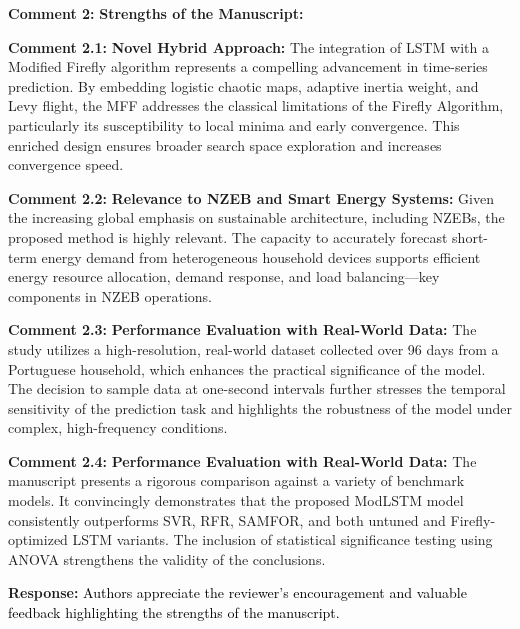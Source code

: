 \documentclass[12pt]{article}
\begin{document}
\noindent\textbf{Comment 2:} \textbf{Strengths of the Manuscript:} 






\noindent\textbf{Comment 2.1:} \textbf{Novel Hybrid Approach:} The integration of LSTM with a Modified Firefly algorithm represents a compelling advancement in time-series prediction. By embedding logistic chaotic maps, adaptive inertia weight, and Levy flight, the MFF addresses the classical limitations of the Firefly Algorithm, particularly its susceptibility to local minima and early convergence. This enriched design ensures broader search space exploration and increases convergence speed. \newline


   
   
   \noindent\textbf{Comment 2.2:} \textbf{Relevance to NZEB and Smart Energy Systems:} Given the increasing global emphasis on sustainable architecture, including NZEBs, the proposed method is highly relevant. The capacity to accurately forecast short-term energy demand from heterogeneous household devices supports efficient energy resource allocation, demand response, and load balancing—key components in NZEB operations. \newline


   \noindent\textbf{Comment 2.3:} \textbf{Performance Evaluation with Real-World Data:} The study utilizes a high-resolution, real-world dataset collected over 96 days from a Portuguese household, which enhances the practical significance of the model. The decision to sample data at one-second intervals further stresses the temporal sensitivity of the prediction task and highlights the robustness of the model under complex, high-frequency conditions. \newline



\noindent\textbf{Comment 2.4:} \textbf{Performance Evaluation with Real-World Data:} The manuscript presents a rigorous comparison against a variety of benchmark models. It convincingly demonstrates that the proposed ModLSTM model consistently outperforms SVR, RFR, SAMFOR, and both untuned and Firefly-optimized LSTM variants. The inclusion of statistical significance testing using ANOVA strengthens the validity of the conclusions. 
\vspace{0.15cm}

\hspace{-1.5em}\textbf{Response:}
\noindent\textcolor{black}{Authors appreciate the reviewer’s encouragement and valuable feedback highlighting the strengths of the manuscript.}\newline
\newline
\end{document}
